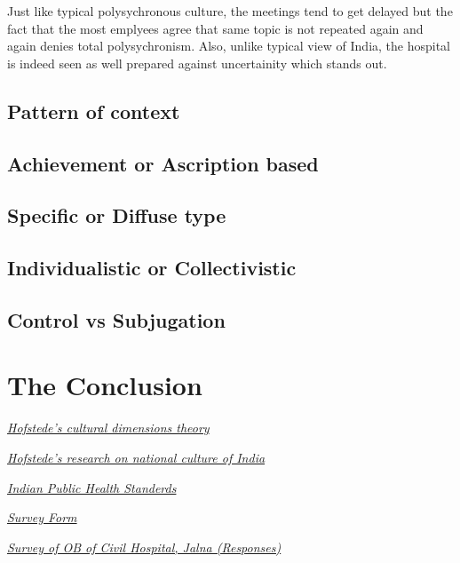 \documentclass{article}
\begin{document}
Just like typical polysychronous culture, the meetings tend to get delayed but the fact that the most emplyees agree that same topic is not repeated again and again denies total polysychronism. Also, unlike typical view of India, the hospital is indeed seen as well prepared against uncertainity which stands out.

\subsection{Pattern of context}



\subsection{Achievement or Ascription based}
\subsection{Specific or Diffuse type}
\subsection{Individualistic or Collectivistic}
\subsection{Control vs Subjugation}

\section{The Conclusion}

\begin{thebibliography}{99}

    {\em \href{https://en.wikipedia.org/wiki/Hofstede%27s_cultural_dimensions_theory#Dimensions_of_national_culturess/}{Hofstede's cultural dimensions theory}}

    {\em \href{https://www.hofstede-insights.com/country-comparison/india/}{Hofstede's research on national culture of India}}

    {\em \href{https://nhm.gov.in/images/pdf/guidelines/iphs/iphs-revised-guidlines-2022/01-SDH_DH_IPHS_Guidelines-2022.pdf}{Indian Public Health Standerds}}

    {\em \href{https://drive.google.com/file/d/1fBm0hNM2xrKJiMaiN55BHcJJa5gY-k8D/view?usp=share_link}{Survey Form}}

    {\em \href{https://docs.google.com/spreadsheets/d/13JBPbaedCzGmHHtawIFe-Poizsp84CtahEr07WUdKAw/edit?usp=sharing}{Survey of OB of Civil Hospital, Jalna (Responses)}}

\end{thebibliography}
\end{document}
